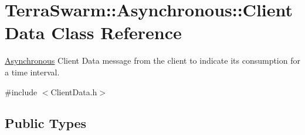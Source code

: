 \hypertarget{class_terra_swarm_1_1_asynchronous_1_1_client_data}{\section{Terra\-Swarm\-:\-:Asynchronous\-:\-:Client\-Data Class Reference}
\label{class_terra_swarm_1_1_asynchronous_1_1_client_data}
}


\hyperlink{namespace_terra_swarm_1_1_asynchronous}{Asynchronous} Client Data message from the client to indicate its consumption for a time interval.  




{\ttfamily \#include $<$Client\-Data.\-h$>$}

\subsection*{Public Types}
